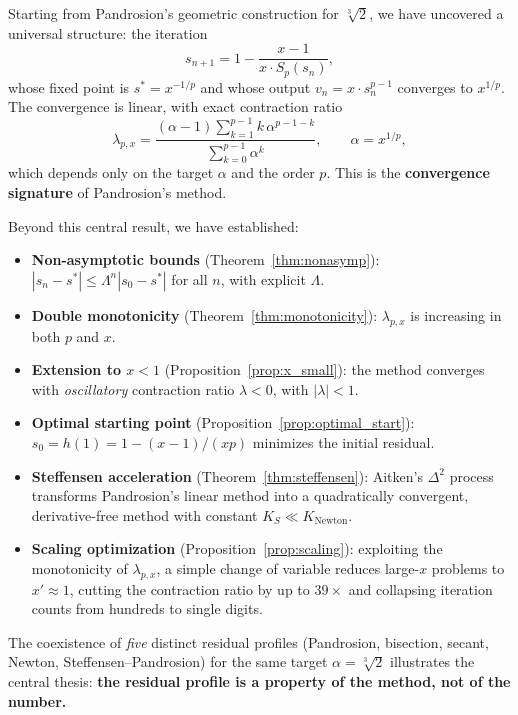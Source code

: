 \documentclass[11pt,a4paper]{article}
\theoremstyle{definition}
\newcommand{\cbrt}[1]{\sqrt[3]{#1}}
\begin{document}
Starting from Pandrosion's geometric construction for $\cbrt{2}$, we have uncovered a universal structure: the iteration
\[
  s_{n+1} = 1 - \frac{x-1}{x \cdot S_p(s_n)},
\]
whose fixed point is $s^* = x^{-1/p}$ and whose output $v_n = x \cdot s_n^{p-1}$ converges to $x^{1/p}$. The convergence is linear, with exact contraction ratio
\[
  \lambda_{p,x} = \frac{(\alpha-1)\displaystyle\sum_{k=1}^{p-1} k\,\alpha^{p-1-k}}{\displaystyle\sum_{k=0}^{p-1}\alpha^k}, \qquad \alpha = x^{1/p},
\]
which depends only on the target $\alpha$ and the order $p$. This is the \textbf{convergence signature} of Pandrosion's method.

\medskip

Beyond this central result, we have established:
\begin{itemize}
  \item \textbf{Non-asymptotic bounds} (Theorem~\ref{thm:nonasymp}): $|s_n - s^*| \leq \Lambda^n |s_0 - s^*|$ for all $n$, with explicit $\Lambda$.
  \item \textbf{Double monotonicity} (Theorem~\ref{thm:monotonicity}): $\lambda_{p,x}$ is increasing in both $p$ and $x$.
  \item \textbf{Extension to $x < 1$} (Proposition~\ref{prop:x_small}): the method converges with \emph{oscillatory} contraction ratio $\lambda < 0$, with $|\lambda| < 1$.
  \item \textbf{Optimal starting point} (Proposition~\ref{prop:optimal_start}): $s_0 = h(1) = 1 - (x-1)/(xp)$ minimizes the initial residual.
  \item \textbf{Steffensen acceleration} (Theorem~\ref{thm:steffensen}): Aitken's $\Delta^2$ process transforms Pandrosion's linear method into a quadratically convergent, derivative-free method with constant $K_S \ll K_{\text{Newton}}$.
  \item \textbf{Scaling optimization} (Proposition~\ref{prop:scaling}): exploiting the monotonicity of $\lambda_{p,x}$, a simple change of variable reduces large-$x$ problems to $x' \approx 1$, cutting the contraction ratio by up to $39\times$ and collapsing iteration counts from hundreds to single digits.
\end{itemize}

\medskip

The coexistence of \emph{five} distinct residual profiles (Pandrosion, bisection, secant, Newton, Steffensen--Pandrosion) for the same target $\alpha = \cbrt{2}$ illustrates the central thesis: \textbf{the residual profile is a property of the method, not of the number.}
\end{document}
